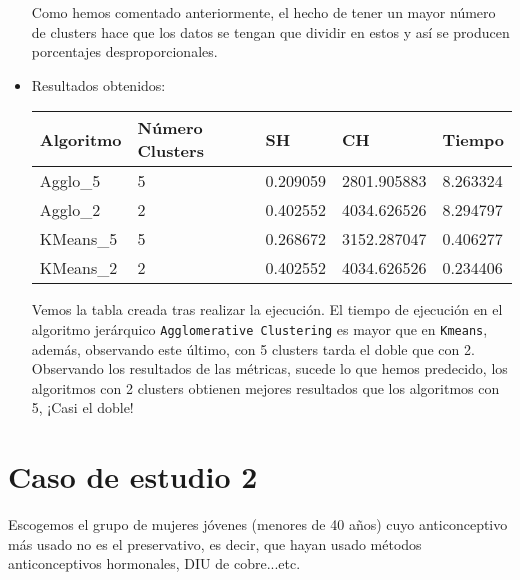 \begin{itemize}
\begin{table}[H]
		\end{table}
	
		Como hemos comentado anteriormente, el hecho de tener un mayor número de clusters hace que los datos se tengan que dividir en estos y así se producen porcentajes desproporcionales.
	
	
		\item Resultados obtenidos:
		
		\begin{table}[H]
				\centering
				\begin{tabular}{|l|l|l|l|l|}
					\hline
					\textbf{Algoritmo} & \textbf{Número Clusters} & \textbf{SH} & \textbf{CH} & \textbf{Tiempo} \\ \hline
					Agglo\_5           & 5                        & 0.209059    & 2801.905883 & 8.263324        \\ \hline
					Agglo\_2           & 2                        & 0.402552    & 4034.626526 & 8.294797        \\ \hline
					KMeans\_5          & 5                        & 0.268672    & 3152.287047 & 0.406277        \\ \hline
					KMeans\_2          & 2                        & 0.402552    & 4034.626526 & 0.234406        \\ \hline
				\end{tabular}%
			
		\end{table}
	
		Vemos la tabla creada tras realizar la ejecución. El tiempo de ejecución en el algoritmo jerárquico \texttt{Agglomerative Clustering} es mayor que en \texttt{Kmeans}, además, observando este último, con 5 clusters tarda el doble que con 2. Observando los resultados de las métricas, sucede lo que hemos predecido, los algoritmos con 2 clusters obtienen mejores resultados que los algoritmos con 5, ¡Casi el doble!


	\end{itemize}
	
	
	
	
	
	
	
	
	
	
	
	
	
	
	\section{Caso de estudio 2}
	
	Escogemos el grupo de mujeres jóvenes (menores de 40 años) cuyo anticonceptivo más usado no es el preservativo, es decir, que hayan usado métodos anticonceptivos hormonales, DIU de cobre...etc. 
	
